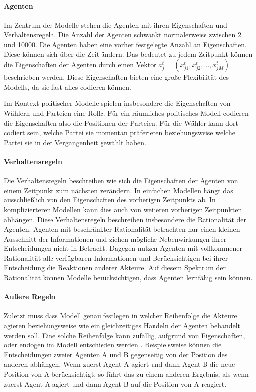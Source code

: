 \paragraph{Agenten}
Im Zentrum der Modelle stehen die Agenten mit ihren Eigenschaften und Verhaltensregeln.
Die Anzahl der Agenten schwankt normalerweise zwischen 2 und 10000.
Die Agenten haben eine vorher festgelegte Anzahl an Eigenschaften.
Diese können sich über die Zeit ändern.
Das bedeutet zu jedem Zeitpunkt können die Eigenschaften der Agenten durch einen Vektor $a_j^t = (x_{j1}^t, x_{j2}^t,..., x_{jM}^t)$ beschrieben werden.
Diese Eigenschaften bieten eine große Flexibilität des Modells, da sie fast alles codieren können. \citep[S.\,7]{marchi2014ABMs}

Im Kontext politischer Modelle spielen insbesondere die Eigenschaften von Wählern und Parteien eine Rolle.
Für ein räumliches politisches Modell codieren die Eigenschaften also die Positionen der Parteien.
Für die Wähler kann dort codiert sein, welche Partei sie momentan präferieren beziehungsweise welche Partei sie in der Vergangenheit gewählt haben.

\paragraph{Verhaltensregeln}
Die Verhaltensregeln beschreiben wie sich die Eigenschaften der Agenten von einem Zeitpunkt zum nächsten verändern. In einfachen Modellen hängt das ausschließlich von den Eigenschaften des vorherigen Zeitpunkts ab. In komplizierteren Modellen kann dies auch von weiteren vorherigen Zeitpunkten abhängen. Diese Verhaltensregeln beschreiben insbesondere die Rationalität der Agenten. Agenten mit beschränkter Rationalität betrachten nur einen kleinen Ausschnitt der Informationen und ziehen mögliche Nebenwirkungen ihrer Entscheidungen nicht in Betracht. Dagegen nutzen Agenten mit vollkommener Rationalität alle verfügbaren Informationen und Berücksichtigen bei ihrer Entscheidung die Reaktionen anderer Akteure. Auf diesem Spektrum der Rationalität können Modelle berücksichtigen, dass Agenten lernfähig sein können. \citep[S.\,8]{marchi2014ABMs}

\paragraph{Äußere Regeln}
Zuletzt muss dass Modell genau festlegen in welcher Reihenfolge die Akteure agieren beziehungsweise wie ein gleichzeitiges Handeln der Agenten behandelt werden soll.
Eine solche Reihenfolge kann zufällig, aufgrund von Eigenschaften, oder endogen im Modell entschieden werden \citep[S.\,8]{marchi2014ABMs}.
Beispielsweise können die Entscheidungen zweier Agenten A und B gegenseitig von der Position des anderen abhängen. Wenn zuerst Agent A agiert und dann Agent B die neue Position von A berücksichtigt, so führt das zu einem anderen Ergebnis, als wenn zuerst Agent A agiert und dann Agent B auf die Position von A reagiert. 

